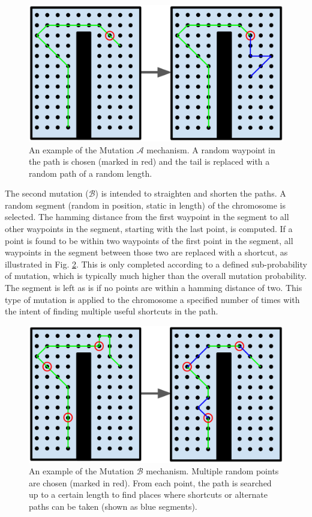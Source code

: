 \documentclass[letterpaper, 10 pt, conference]{ieeeconf}  %
\begin{document}
\begin{figure}
\centering
\includegraphics[width=1.0\linewidth]{figures/mutation.png}
\caption{An example of the Mutation $\mathcal{A}$ mechanism. A random waypoint in the path is chosen (marked in red) and the tail is replaced with a random path of a random length.}
\label{fig:mutation}
\end{figure}

The second mutation ($\mathcal{B}$) is intended to straighten and shorten the paths. A random segment (random in position, static in length) of the chromosome is selected. The hamming distance from the first waypoint in the segment to all other waypoints in the segment, starting with the last point, is computed. If a point is found to be within two waypoints of the first point in the segment, all waypoints in the segment between those two are replaced with a shortcut, as illustrated in Fig. \ref{fig:muterpolation}. This is only completed according to a defined sub-probability of mutation, which is typically much higher than the overall mutation probability. The segment is left as is if no points are within a hamming distance of two. This type of mutation is applied to the chromosome a specified number of times with the intent of finding multiple useful shortcuts in the path.

\begin{figure}
\centering
\includegraphics[width=1.0\linewidth]{figures/muterpolation.png}
\caption{An example of the Mutation $\mathcal{B}$ mechanism. Multiple random points are chosen (marked in red). From each point, the path is searched up to a certain length to find places where shortcuts or alternate paths can be taken (shown as blue segments).}
\label{fig:muterpolation}
\end{figure}
\end{document}
